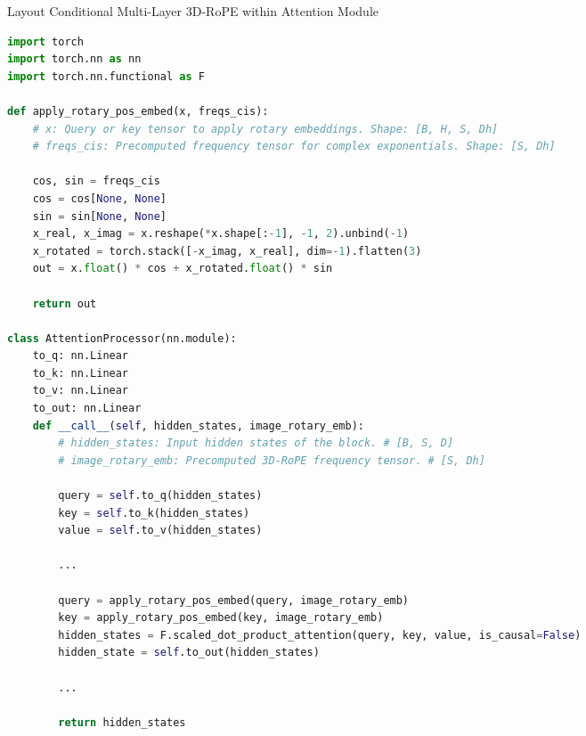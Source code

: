 \twocolumn


\onecolumn

\begin{minipage}[b]{1\columnwidth}
\begin{algorithm}[H]
\SetAlgoLined
\caption{Layout Conditional Multi-Layer 3D-RoPE within Attention Module}
\label{algo:3drope_2}
\tiny
\begin{lstlisting}[language=Python]
import torch
import torch.nn as nn
import torch.nn.functional as F

def apply_rotary_pos_embed(x, freqs_cis):
    # x: Query or key tensor to apply rotary embeddings. Shape: [B, H, S, Dh]
    # freqs_cis: Precomputed frequency tensor for complex exponentials. Shape: [S, Dh]
    
    cos, sin = freqs_cis
    cos = cos[None, None]
    sin = sin[None, None]
    x_real, x_imag = x.reshape(*x.shape[:-1], -1, 2).unbind(-1)
    x_rotated = torch.stack([-x_imag, x_real], dim=-1).flatten(3)
    out = x.float() * cos + x_rotated.float() * sin

    return out

class AttentionProcessor(nn.module):
    to_q: nn.Linear
    to_k: nn.Linear
    to_v: nn.Linear
    to_out: nn.Linear
    def __call__(self, hidden_states, image_rotary_emb):
        # hidden_states: Input hidden states of the block. # [B, S, D]
        # image_rotary_emb: Precomputed 3D-RoPE frequency tensor. # [S, Dh]
        
        query = self.to_q(hidden_states)
        key = self.to_k(hidden_states)
        value = self.to_v(hidden_states)

        ...

        query = apply_rotary_pos_embed(query, image_rotary_emb)
        key = apply_rotary_pos_embed(key, image_rotary_emb)
        hidden_states = F.scaled_dot_product_attention(query, key, value, is_causal=False)
        hidden_state = self.to_out(hidden_states)
        
        ...

        return hidden_states
        

\end{lstlisting}
\end{algorithm}
\end{minipage}





